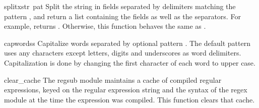 \begin{funcdesc}{splitx}{str\, pat}
Split the string  in fields separated by delimiters matching
the pattern , and return a list containing the fields as well
as the separators.  For example,  returns
\code{['a', ':::', 'b']}.  Otherwise, this function behaves the same
as .
\end{funcdesc}

\begin{funcdesc}{capwords}{s}
Capitalize words separated by optional pattern .  The default
pattern uses any characters except letters, digits and underscores as
word delimiters.  Capitalization is done by changing the first
character of each word to upper case.
\end{funcdesc}

\begin{funcdesc}{clear_cache}{}
The regsub module maintains a cache of compiled regular expressions,
keyed on the regular expression string and the syntax of the regex
module at the time the expression was compiled.  This function clears
that cache.
\end{funcdesc}
